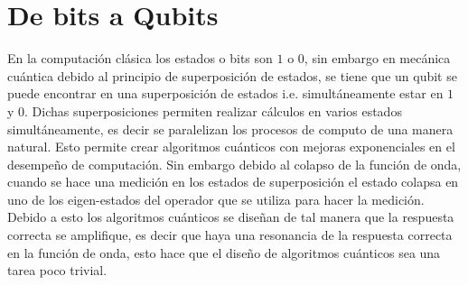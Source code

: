 \documentclass[a4paper]{article}
\begin{document}
\section{De bits a Qubits}
En la computación clásica los estados o bits son $1$ o $0$, sin embargo en mecánica cuántica debido al principio de superposición de estados, se tiene que un qubit se puede encontrar en una superposición de estados i.e. simultáneamente estar en $1$ y $0$. Dichas superposiciones permiten realizar cálculos en varios estados simultáneamente, es decir se paralelizan los procesos de computo de una manera natural. Esto permite crear algoritmos cuánticos con mejoras exponenciales en el desempeño de computación. Sin embargo debido al colapso de la función de onda, cuando se hace una medición en los estados de superposición el estado colapsa en uno de los eigen-estados del operador que se utiliza para hacer la medición. \\
Debido a esto los algoritmos cuánticos se diseñan de tal manera que la respuesta correcta se amplifique, es decir que haya una resonancia de la respuesta correcta en la función de onda, esto hace que el diseño de algoritmos cuánticos sea una tarea poco trivial.
\end{document}
